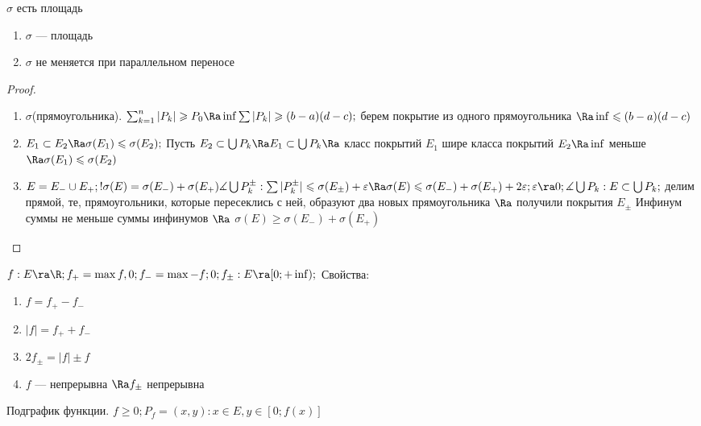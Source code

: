 \begin{theorem}{$\sigma$ есть площадь}
	\begin{enumerate}
		\item $\sigma$ --- площадь
		\item $\sigma$ не меняется при параллельном переносе
	\end{enumerate}
\end{theorem}
\begin{proof}
	\begin{enumerate}
	\item
		$\sigma$(прямоугольника).
		$\sum_{k = 1}^n |P_k| \geqslant P_0 \Ra \inf{\sum|P_k|} \geqslant (b - a)(d - c); $
		берем покрытие из одного прямоугольника $\Ra \inf \leqslant (b - a)(d - c)$
	
	\item
		$E_1 \subset E_2 \Ra \sigma(E_1) \leqslant \sigma(E_2); $
		Пусть $E_2 \subset \bigcup P_k \Ra E_1 \subset \bigcup P_k \Ra$ класс покрытий $E_1$ шире класса покрытий $E_2 \Ra \inf $ меньше $\Ra \sigma(E_1) \leqslant \sigma(E_2)$

	\item
		$E = E_{-} \cup E_{+}; ! \sigma(E) = \sigma(E_{-}) + \sigma(E_{+}) \measuredangle \bigcup P_k^{\pm}:
		\sum|P_k^{\pm}| \leqslant \sigma(E_{\pm}) + \varepsilon \Ra \sigma(E) \leqslant \sigma(E_{-}) + \sigma(E_{+}) + 2\varepsilon;
		\varepsilon \ra 0; \measuredangle \bigcup P_k: E \subset \bigcup P_k; $
		делим прямой, те, прямоугольники, которые пересеклись с ней, образуют два новых прямоугольника $\Ra$ получили покрытия $E_{\pm}$
		Инфинум суммы не меньше суммы инфинумов $\Ra$ $\sigma(E) \geqslant \sigma(E_{-}) + \sigma(E_{+})$

	\end{enumerate}
\end{proof}

\begin{Def}
	$f: E \ra \R ; f_+ = \max {f, 0}; f_- = \max {-f; 0}; f_\pm : E \ra [0; +\inf); $  Свойства:
	\begin{enumerate}
		\item $f = f_+ - f_- $
		\item $|f| = f_+ + f_- $
		\item $2f_\pm = |f| \pm f$
		\item $f$ --- непрерывна $ \Ra f_\pm $ непрерывна
	\end{enumerate}
\end{Def}

\begin{Def}
	Подграфик функции. $ f \geqslant 0; P_f = {(x, y): x \in E, y \in [0; f(x)]} $
\end{Def}

